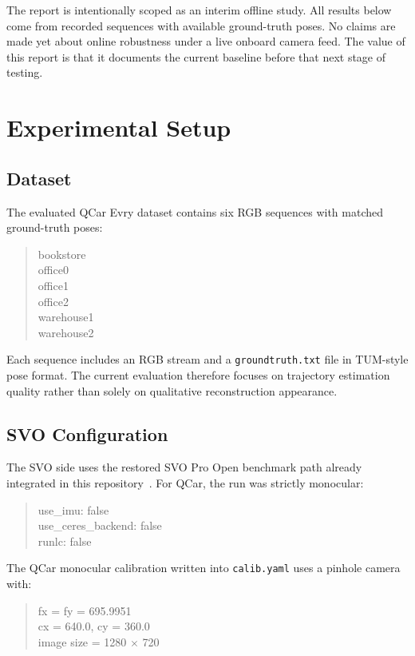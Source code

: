 \documentclass[conference]{IEEEtran}
\newcommand{\code}[1]{\mbox{\texttt{#1}}}
\begin{document}
The report is intentionally scoped as an interim offline study. All results below come from recorded sequences with available ground-truth poses. No claims are made yet about online robustness under a live onboard camera feed. The value of this report is that it documents the current baseline before that next stage of testing.

\section{Experimental Setup}

\subsection{Dataset}
The evaluated QCar Evry dataset contains six RGB sequences with matched ground-truth poses:
\begin{quote}
\ttfamily\small
bookstore\\
office0\\
office1\\
office2\\
warehouse1\\
warehouse2
\end{quote}

Each sequence includes an RGB stream and a \code{groundtruth.txt} file in TUM-style pose format. The current evaluation therefore focuses on trajectory estimation quality rather than solely on qualitative reconstruction appearance.

\subsection{SVO Configuration}
The SVO side uses the restored SVO Pro Open benchmark path already integrated in this repository~\cite{forster2017svo}. For QCar, the run was strictly monocular:
\begin{quote}
\ttfamily\small
use\_imu: false\\
use\_ceres\_backend: false\\
runlc: false
\end{quote}

The QCar monocular calibration written into \code{calib.yaml} uses a pinhole camera with:
\begin{quote}
\ttfamily\small
fx = fy = 695.9951\\
cx = 640.0,\; cy = 360.0\\
image size = 1280 $\times$ 720
\end{quote}
\end{document}
